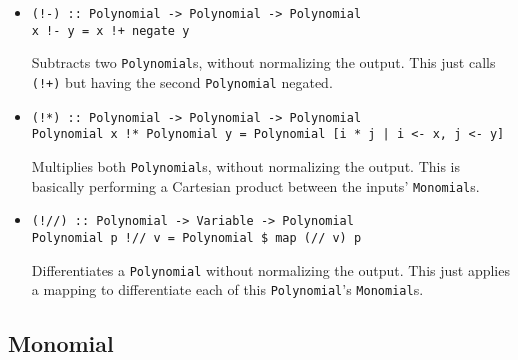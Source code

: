 \documentclass[11pt,a4paper]{article}
\begin{document}
\begin{itemize}
    \item \begin{lstlisting}
(!-) :: Polynomial -> Polynomial -> Polynomial
x !- y = x !+ negate y
    \end{lstlisting}

    Subtracts two \lstinline{Polynomial}s, without normalizing the output. This just calls \lstinline{(!+)} but having the second \lstinline{Polynomial} negated.

    \item \begin{lstlisting}
(!*) :: Polynomial -> Polynomial -> Polynomial
Polynomial x !* Polynomial y = Polynomial [i * j | i <- x, j <- y]
    \end{lstlisting}

    Multiplies both \lstinline{Polynomial}s, without normalizing the output. This is basically performing a Cartesian product between the inputs' \lstinline{Monomial}s.

    \item \begin{lstlisting}
(!//) :: Polynomial -> Variable -> Polynomial
Polynomial p !// v = Polynomial $ map (// v) p
    \end{lstlisting}

    Differentiates a \lstinline{Polynomial} without normalizing the output. This just applies a mapping to differentiate each of this \lstinline{Polynomial}'s \lstinline{Monomial}s.

\end{itemize}

\subsection{Monomial}
\end{document}
